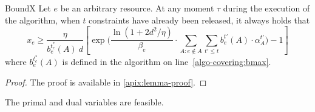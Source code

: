 \setcounter{theorem}{0}
\begin{lemma}{BoundX}
\label{lem:bound-x}
Let $e$ be an arbitrary resource.
At any moment $\tau$ during the execution of the algorithm,
when $t$ constraints have already been released, it always holds that
$$
x_{e}	\geq  \frac{\eta}{b^{t_{e}^{*}}_{e}(A) \ d}
		\left[ \exp\biggl( \frac{\ln(1+2d^{2}/\eta)}{\beta_{e}}
				\cdot \sum_{A: e \notin A} \sum_{t' \le t} b^{t'}_{e}(A) \cdot \alpha^{t'}_{A} \biggr) - 1 \right]
$$
where $b^{t_{e}^{*}}_{e}(A)$ is defined in the algorithm on line~\ref{algo-covering:bmax}.
\end{lemma}
\begin{proof}
	The proof is available in \cref{apix:lemma-proof}.
\end{proof}
%
\begin{lemma} \label{lem:prim-dual-feasible}
The primal and dual variables are feasible.
\end{lemma}
%
